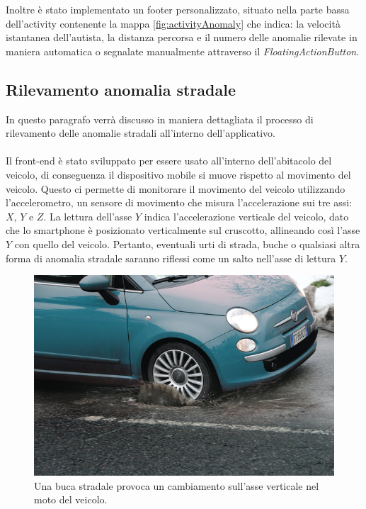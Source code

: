 \documentclass[a4paper, 11pt]{article} %
\begin{document}
Inoltre è stato implementato un footer personalizzato, situato nella parte bassa dell'activity contenente la mappa \ref{fig:activityAnomaly} che indica: la velocità istantanea dell'autista, la distanza percorsa e il numero delle anomalie rilevate in maniera automatica o segnalate manualmente attraverso il \textit{FloatingActionButton}.

\subsection*{Rilevamento anomalia stradale}

In questo paragrafo verrà discusso in maniera dettagliata il processo di rilevamento delle anomalie stradali all'interno dell'applicativo.\\\\
Il front-end è stato sviluppato per essere usato all'interno dell'abitacolo del veicolo, di conseguenza il dispositivo mobile si muove rispetto al movimento del veicolo. 
Questo ci permette di monitorare il movimento del veicolo utilizzando l'accelerometro, un sensore di movimento che misura l'accelerazione sui tre assi: $X$, $Y$ e $Z$. La lettura dell'asse $Y$ indica l'accelerazione verticale del veicolo, dato che
lo smartphone è posizionato verticalmente sul cruscotto, allineando così l'asse $Y$ con quello del veicolo. Pertanto, eventuali urti di strada, buche o qualsiasi altra forma di anomalia stradale saranno riflessi come un salto nell'asse di lettura $Y$. 
\begin{figure}[h]
	\begin{center}
		\includegraphics[width=\textwidth]{images/pothole.jpg}
	\end{center}
	\caption{Una buca stradale provoca un cambiamento sull'asse verticale nel moto del veicolo.}
	\label{fig:pothole}
\end{figure}
\end{document}
